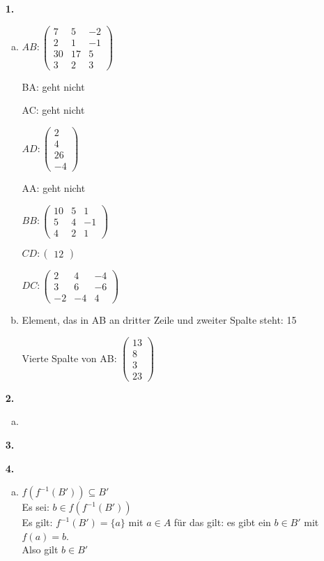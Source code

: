 \documentclass[a4paper]{scrartcl}
\title{\titleinfo}
\author{Elena Noll, Sven-Hendrik Haase, Arne Feil}
\date{\today}
\begin{document}
\maketitle

\begin{enumerate}
\item[\textbf{1.}]
\begin{enumerate}[a)]
\item
$AB:\begin{pmatrix}
7 & 5 & -2 \\
2 & 1 & -1 \\
30 & 17 & 5 \\
3 & 2 & 3
\end{pmatrix}$

BA: geht nicht

AC: geht nicht

$AD:\begin{pmatrix}
2 \\
4 \\
26 \\
-4
\end{pmatrix}$

AA: geht nicht

$BB:\begin{pmatrix}
10 & 5 & 1 \\
5 & 4 & -1 \\
4 & 2 & 1
\end{pmatrix}$

$CD:\begin{pmatrix}
12
\end{pmatrix}$

$DC:\begin{pmatrix}
2 & 4 & -4 \\
3 & 6 & -6 \\
-2 & -4 & 4
\end{pmatrix}$

\item
Element, das in AB an dritter Zeile und zweiter Spalte steht: 15

Vierte Spalte von AB: $\begin{pmatrix}
13 \\
8 \\
3 \\
23
\end{pmatrix}$
\end{enumerate}

\item[\textbf{2.}]
\begin{enumerate}[a)]
\item
\end{enumerate}
\item[\textbf{3.}]

\item[\textbf{4.}]
\begin{enumerate}[a)]
\item
$f(f^{-1}(B')) \subseteq B'$\\
Es sei: $b \in f(f^{-1}(B'))$\\
Es gilt: $f^{-1}(B')=\{a\}$ mit $a\in A$ für das gilt: es gibt ein $b
\in B'$ mit $f(a)=b$.\\
Also gilt $b\in B'$
\end{enumerate}
\end{enumerate}
\end{document}
